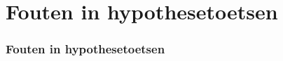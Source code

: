 \documentclass{beamer}
\begin{document}
\section{Fouten in hypothesetoetsen}
\sectionframelogo{}

\begin{frame}
  \frametitle{Fouten in hypothesetoetsen}

  \begin{table}
    \centering
    \caption{Mogelijke fouten bij het trekken van conclusies uit statistische toetsen.}
    \label{tab:hypfouten}
  \end{table}
\end{frame}
\end{document}
